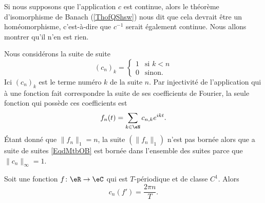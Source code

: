 Si nous supposons que l'application \( c\) est continue, alors le théorème d'isomorphisme de Banach (\ref{ThofQShsw}) nous dit que cela devrait être un homéomorphisme, c'est-à-dire que \( c^{-1}\) serait également continue. Nous allons montrer qu'il n'en est rien.

Nous considérons la suite de suite
\begin{equation}    \label{EqdMtbOB}
    (c_n)_k=\begin{cases}
        1    &   \text{si } k<n\\
        0    &    \text{sinon}.
    \end{cases}
\end{equation}
Ici \( (c_n)_k\) est le terme numéro \( k\) de la suite \( n\). Par injectivité de l'application qui à une fonction fait correspondre la suite de ses coefficients de Fourier, la seule fonction qui possède ces coefficients est
\begin{equation}
    f_n(t)=\sum_{k\in \eN}c_{n,k} e^{ikt}.
\end{equation}
Étant donné que \( \| f_n \|_1=n\), la suite \( (\| f_n \|_1)\) n'est pas bornée alors que a suite de suites \eqref{EqdMtbOB} est bornée dans l'ensemble des suites parce que \( \| c_n \|_{\infty}=1\).

\begin{lemma}       \label{LEMooPUJDooKRBTaU}
    Soit une fonction \( f\colon \eR\to \eC\) qui est \( T\)-périodique et de classe \( C^1\). Alors
    \begin{equation}
        c_n(f')=\frac{ 2\pi n }{ T }.
    \end{equation}
\end{lemma}

